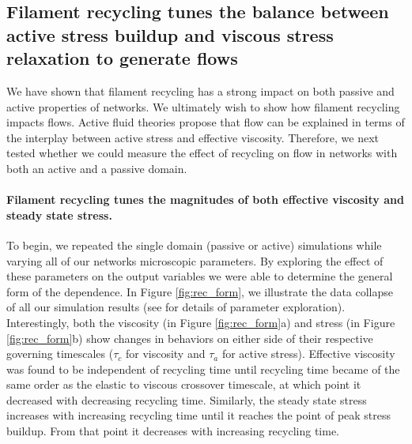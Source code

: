 \documentclass[10pt,letterpaper]{article}
\begin{document}
\subsection*{Filament recycling tunes the balance between active stress buildup and viscous stress relaxation to generate flows}
We have shown that filament recycling has a strong impact on both passive and active properties of networks.  We ultimately wish to show how filament recycling impacts flows.  Active fluid theories propose that flow can be explained in terms of the interplay between active stress and effective viscosity. Therefore, we next tested whether we could measure the effect of recycling on flow in networks with both an active and a passive domain.
 

\paragraph{Filament recycling tunes the magnitudes of both effective viscosity and steady state stress.}  
To begin, we repeated the single domain (passive or active) simulations while varying all of our networks microscopic parameters.   By exploring the effect of these parameters on the output variables we were able to determine the general form of the dependence. In Figure \ref{fig:rec_form}, we illustrate the data collapse of all our simulation results (see  for details of parameter exploration).  Interestingly, both the viscosity (in Figure \ref{fig:rec_form}a) and stress (in Figure \ref{fig:rec_form}b) show changes in behaviors on either side of their respective governing timescales ($\tau_c$ for viscosity and $\tau_a$ for active stress).  Effective viscosity was found to be independent of recycling time until recycling time became of the same order as the elastic to viscous crossover timescale, at which point it decreased with decreasing recycling time.  Similarly, the steady state stress increases with increasing recycling time until it reaches the point of peak stress buildup.  From that point it decreases with increasing recycling time.
\end{document}
